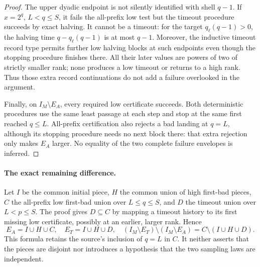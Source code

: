 \documentclass[11pt]{article}
\theoremstyle{remark}\newtheorem{remark}[proposition]{Remark}
\begin{document}
\begin{proof}
The upper dyadic endpoint is not silently identified with shell \(q-1\).
If \(x=2^q\), \(L<q\le S\), it fails the all-prefix low test but the
timeout procedure succeeds by exact halving. It cannot be a timeout:
for the target \(q_\ell(q-1)>0\), the halving time
\(q-q_\ell(q-1)\) is at most \(q-1\).
Moreover, the inductive timeout record type permits further low halving
blocks at such endpoints even though the stopping procedure finishes
there. All their later values are powers of two of strictly smaller rank;
none produces a low timeout or returns to a high rank. Thus those extra
record continuations do not add a failure overlooked in the argument.

Finally, on \(I_M\setminus E_A\), every required low certificate succeeds.
Both deterministic procedures use the same least passage at each step
and stop at the same first reached \(q\le L\). All-prefix certification
also rejects a bad landing at \(q=L\), although its stopping procedure
needs no next block there: that extra rejection only makes \(E_A\) larger.
No equality of the two complete failure envelopes is inferred.
\end{proof}

\paragraph{The exact remaining difference.}
Let \(I\) be the common initial piece, \(H\) the common union of high
first-bad pieces, \(C\) the all-prefix low first-bad union over
\(L\le q\le S\), and \(D\) the timeout union over \(L<p\le S\).
The proof gives \(D\subseteq C\) by mapping a timeout history to its first
missing low certificate, possibly at an earlier, larger rank. Hence
\begin{equation}\label{eq:shaik-timeout-certificate-defect}
 E_A=I\cup H\cup C,\quad E_T=I\cup H\cup D,\quad
 (I_M\setminus E_T)\setminus(I_M\setminus E_A)
       =C\setminus(I\cup H\cup D).
\end{equation}
This formula retains the source's inclusion of \(q=L\) in \(C\).
It neither asserts that the pieces are disjoint nor introduces a
hypothesis that the two sampling laws are independent.
\end{document}
